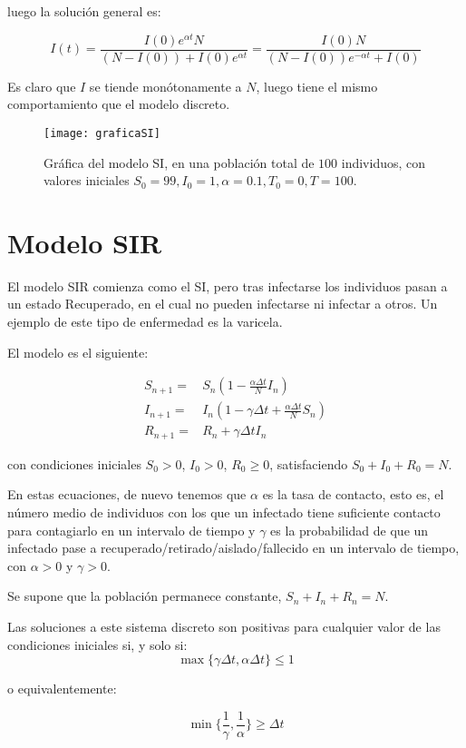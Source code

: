 luego la solución general es:

$$I(t) = \frac{I(0)e^{\alpha t}N}{(N-I(0))+I(0)e^{\alpha t}} = \frac{I(0)N}{(N-I(0))e^{-\alpha t}+I(0)}$$

Es claro que $I$ se tiende monótonamente a $N$, luego tiene el mismo comportamiento que el modelo discreto.


\begin{figure}
\begin{center}
\caption{Gráfica del modelo SI, en una población total de $100$ individuos, con valores iniciales $S_0=99, I_0 = 1, \alpha = 0.1, T_0 = 0, T = 100$.}
\texttt{[image: graficaSI]}
\end{center}
\end{figure}

\section{Modelo SIR}
El modelo SIR comienza como el SI, pero tras infectarse los individuos pasan a un estado Recuperado, en el cual no pueden infectarse ni infectar a otros.
Un ejemplo de este tipo de enfermedad es la varicela. 

El modelo es el siguiente:

\begin{equation}
\label{eqn: SIR_modelo}
\begin{aligned}
S_{n+1} = & S_n \left(1-\frac{\alpha\Delta t}{N} I_n \right) \\
I_{n+1} = & I_n \left( 1-\gamma \Delta t + \frac{\alpha\Delta t}{N} S_n \right) \\
R_{n+1} = & R_n + \gamma \Delta t I_n
\end{aligned}
\end{equation}

con condiciones iniciales $S_0>0$, $I_0>0$, $R_0\geq 0$, satisfaciendo $S_0+I_0+R_0=N$.

En estas ecuaciones, de nuevo tenemos que $\alpha$ es la tasa de contacto, esto es, el número medio de individuos con los que un infectado tiene suficiente contacto para contagiarlo en un intervalo de tiempo y $\gamma$ es la probabilidad de que un infectado pase a recuperado/retirado/aislado/fallecido en un intervalo de tiempo, con $\alpha >0$ y $\gamma >0$.

Se supone que la población permanece constante, $S_n+I_n+R_n=N$.

\begin{proposition}
Las soluciones a este sistema discreto son positivas para cualquier valor de las condiciones iniciales si, y solo si:
$$\max{\big\{\gamma\Delta t, \alpha\Delta t\big\} } \leq 1$$

o equivalentemente:

$$\min{\bigg\{ \frac{1}{\gamma}, \frac{1}{\alpha} \bigg\} } \geq \Delta t$$

\end{proposition}

